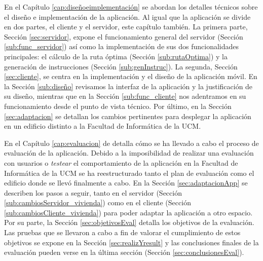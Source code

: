 En el Capítulo \ref{cap:diseñoeimplementación} se abordan los detalles técnicos sobre el diseño e implementación de la aplicación. Al igual que la aplicación se divide en dos partes, el cliente y el servidor, este capítulo también. La primera parte, Sección \ref{sec:servidor}, expone el funcionamiento general del servidor (Sección \ref{sub:func_servidor}) así como la implementación de sus dos funcionalidades principales: el cálculo de la ruta óptima (Sección \ref{sub:rutaOptima}) y la generación de instrucciones (Sección \ref{sub:genInstruc}). La segunda, Sección \ref{sec:cliente}, se centra en la implementación y el diseño de la aplicación móvil. En la Sección \ref{sub:diseño} revisamos la interfaz de la aplicación y la justificación de su diseño, mientras que en la Sección \ref{sub:func_cliente} nos adentramos en su funcionamiento desde el punto de vista técnico. Por último, en la Sección \ref{sec:adaptacion} se detallan los cambios pertinentes para desplegar la aplicación en un edificio distinto a la Facultad de Informática de la UCM.

En el Capítulo \ref{cap:evaluacion} de detalla cómo se ha llevado a cabo el proceso de evaluación de la aplicación. Debido a la imposibilidad de realizar una evaluación con usuarios o \textit{testear} el comportamiento de la aplicación en la Facultad de Informática de la UCM se ha reestructurado tanto el plan de evaluación como el edificio donde se llevó finalmente a cabo. En la Sección \ref{sec:adaptacionApp} se describen los pasos a seguir, tanto en el servidor (Sección \ref{sub:cambiosServidor_vivienda}) como en el cliente (Sección \ref{sub:cambiosCliente_vivienda}) para poder adaptar la aplicación a otro espacio. Por su parte, la Sección \ref{sec:objetivosEval} detalla los objetivos de la evaluación. Las pruebas que se llevaron a cabo a fin de valorar el cumplimiento de estos objetivos se expone en la Sección \ref{sec:realizYresult} y las conclusiones finales de la evaluación pueden verse en la última sección (Sección \ref{sec:conclusionesEval}).